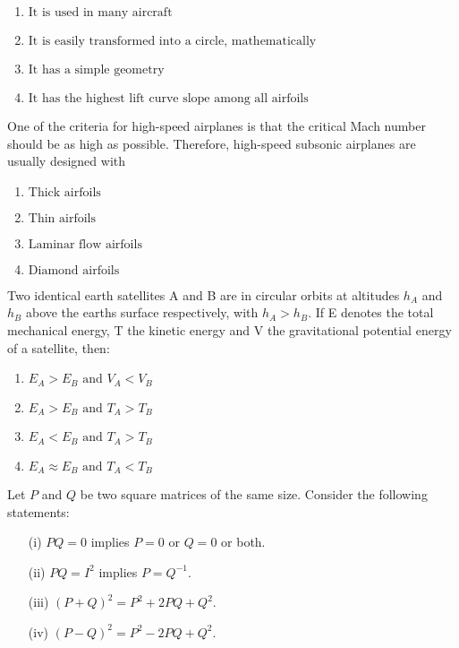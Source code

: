     \begin{enumerate}
        \item $ \text{It is used in many aircraft} $
        \item $ \text{It is easily transformed into a circle, mathematically} $
        \item $ \text{It has a simple geometry} $
        \item $ \text{It has the highest lift curve slope among all airfoils} $
    \end{enumerate}
\bigskip
\item One of the criteria for high-speed airplanes is that the critical Mach number should be as high as possible. Therefore, high-speed subsonic airplanes are usually designed with
\begin{multicols}{2}
    \begin{enumerate}
        \item $ \text{Thick airfoils} $
        \item $ \text{Thin airfoils} $
        \item $ \text{Laminar flow airfoils} $
        \item $ \text{Diamond airfoils} $
    \end{enumerate}
\end{multicols}
\bigskip
\item Two identical earth satellites A and B are in circular orbits at altitudes $h_A$ and $h_B$ above the earths surface respectively, with $h_A > h_B$. If E denotes the total mechanical energy, T the kinetic energy and V the gravitational potential energy of a satellite, then:
\begin{multicols}{2}
    \begin{enumerate}
        \item $ E_A > E_B \text{ and } V_A < V_B $
        \item $ E_A > E_B \text{ and } T_A > T_B $
        \item $ E_A < E_B \text{ and } T_A > T_B $
        \item $ E_A \approx E_B \text{ and } T_A < T_B $
    \end{enumerate}
\end{multicols}
\bigskip
\item Let $P$ and $Q$ be two square matrices of the same size. Consider the following statements:
\begin{enumerate}
    \item[(i)] $PQ = 0$ implies $P = 0$ or $Q = 0$ or both.
    \item[(ii)] $PQ = I^2$ implies $P = Q^{-1}$.
    \item[(iii)] $(P + Q)^2 = P^2 + 2PQ + Q^2$.
    \item[(iv)] $(P - Q)^2 = P^2 - 2PQ + Q^2$.
\end{enumerate}
